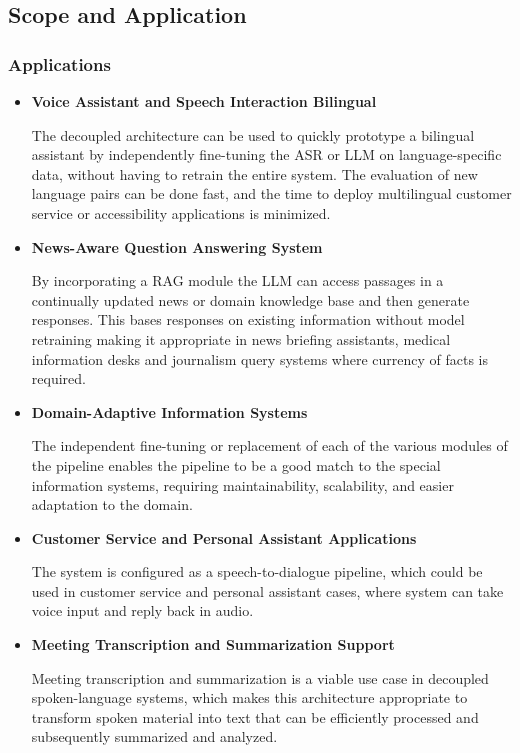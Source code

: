 \subsection{Scope and Application}

    \subsubsection{Applications}
    \begin{itemize}
        \item \textbf{Voice Assistant and Speech Interaction Bilingual}
        
        The decoupled architecture can be used to quickly prototype a bilingual assistant by independently fine-tuning the ASR or LLM on language-specific data, without having to retrain the entire system. The evaluation of new language pairs can be done fast, and the time to deploy multilingual customer service or accessibility applications is minimized.

        \item \textbf{News-Aware Question Answering System}
        
By incorporating a RAG module the LLM can access passages in a continually updated news or domain knowledge base and then generate responses. This bases responses on existing information without model retraining making it appropriate in news briefing assistants, medical information desks and journalism query systems where currency of facts is required.

        \item \textbf{Domain-Adaptive Information Systems} 
        
The independent fine-tuning or replacement of each of the various modules of the pipeline enables the pipeline to be a good match to the special information systems, requiring maintainability, scalability, and easier adaptation to the domain.


        \item \textbf{Customer Service and Personal Assistant Applications}

        The system is configured as a speech-to-dialogue pipeline, which could be used in customer service and personal assistant cases, where system can take voice input and reply back in audio.

        \item \textbf{Meeting Transcription and Summarization Support}

Meeting transcription and summarization is a viable use case in decoupled spoken-language systems, which makes this architecture appropriate to transform spoken material into text that can be efficiently processed and subsequently summarized and analyzed.

    \end{itemize}
    
